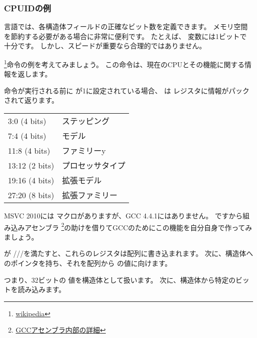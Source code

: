 ﻿\subsubsection{CPUIDの例}

\CCpp 言語では、各構造体フィールドの正確なビット数を定義できます。 
メモリ空間を節約する必要がある場合に非常に便利です。 
たとえば、 \Tbool 変数には1ビットで十分です。 
しかし、スピードが重要なら合理的ではありません。

\newcommand{\FNCPUID}{\footnote{\href{http://go.yurichev.com/17069}{wikipedia}}}

\label{cpuid}

\CPUID\FNCPUID 命令の例を考えてみましょう。
この命令は、現在のCPUとその機能に関する情報を返します。

命令が実行される前に \EAX が1に設定されている場合、
\CPUID は \EAX レジスタに情報がパックされて返ります。

\begin{center}
\begin{tabular}{ | l | l | }
\hline
3:0 (4 bits)& ステッピング \\
7:4 (4 bits) & モデル \\
11:8 (4 bits) & ファミリーy \\
13:12 (2 bits) & プロセッサタイプ \\
19:16 (4 bits) & 拡張モデル \\
27:20 (8 bits) & 拡張ファミリー \\
\hline
\end{tabular}
\end{center}

\newcommand{\FNGCCAS}{\footnote{\href{http://go.yurichev.com/17070}
{GCCアセンブラ内部の詳細}}}

MSVC 2010には \CPUID マクロがありますが、GCC 4.4.1にはありません。 
ですから組み込みアセンブラ \FNGCCAS の助けを借りてGCCのためにこの機能を自分自身で作ってみましょう。



\CPUID が \EAX/\EBX/\ECX/\EDX を満たすと、これらのレジスタは配列に書き込まれます。 
次に、構造体へのポインタを持ち、それを配列から \EAX の値に向けます。

つまり、32ビットの \Tint 値を構造体として扱います。 
次に、構造体から特定のビットを読み込みます。

